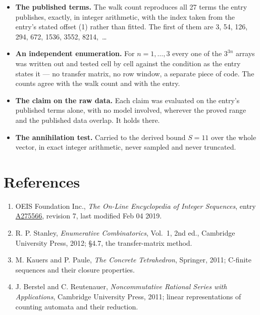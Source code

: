 \documentclass[11pt]{article}
\theoremstyle{definition}
\begin{document}
\begin{itemize}

\item {\bfseries The published terms.} The walk count reproduces all 27 terms the entry publishes, exactly, in integer arithmetic, with the index taken from the entry's stated offset (1) rather than fitted. The first of them are 3, 54, 126, 294, 672, 1536, 3552, 8214,~\dots

\item {\bfseries An independent enumeration.} For $n = 1,\dots,3$ every one of the $3^{3n}$ arrays was written out and tested cell by cell against the condition as the entry states it --- no transfer matrix, no row window, a separate piece of code. The counts agree with the walk count and with the entry.

\item {\bfseries The claim on the raw data.} Each claim was evaluated on the entry's published terms alone, with no model involved, wherever the proved range and the published data overlap. It holds there.

\item {\bfseries The annihilation test.} Carried to the derived bound $S = 11$ over the whole vector, in exact integer arithmetic, never sampled and never truncated.

\end{itemize}

\section{References}

\begin{enumerate}

\item OEIS Foundation Inc., \emph{The On-Line Encyclopedia of Integer Sequences}, entry \href{https://oeis.org/A275566}{A275566}, revision 7, last modified Feb 04 2019.

\item R. P. Stanley, \emph{Enumerative Combinatorics}, Vol.~1, 2nd ed., Cambridge University Press, 2012; \S4.7, the transfer-matrix method.

\item M. Kauers and P. Paule, \emph{The Concrete Tetrahedron}, Springer, 2011; C-finite sequences and their closure properties.

\item J. Berstel and C. Reutenauer, \emph{Noncommutative Rational Series with Applications}, Cambridge University Press, 2011; linear representations of counting automata and their reduction.

\end{enumerate}
\end{document}
